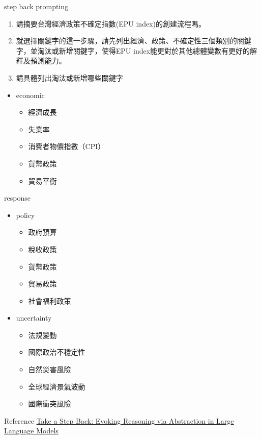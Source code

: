 \documentclass[12pt]{beamer}
\begin{document}
\begin{frame}{step back prompting}
    \begin{enumerate}
        \item 請摘要台灣經濟政策不確定指數(EPU index)的創建流程嗎。
        \item 就選擇關鍵字的這一步驟，請先列出經濟、政策、不確定性三個類別的關鍵字，並淘汰或新增關鍵字，使得EPU index能更對於其他總體變數有更好的解釋及預測能力。
        \item 請具體列出淘汰或新增哪些關鍵字
    \end{enumerate}

    \begin{itemize}
        \item economic
        \begin{itemize}
            \item 經濟成長
            \item 失業率
            \item 消費者物價指數（CPI）
            \item 貨幣政策
            \item 貿易平衡
        \end{itemize}
    \end{itemize}
\end{frame}

\begin{frame}{response}
    \begin{itemize}
        \item policy
        \begin{itemize}
            \item 政府預算
            \item 稅收政策
            \item 貨幣政策
            \item 貿易政策
            \item 社會福利政策
        \end{itemize}
        \item uncertainty
        \begin{itemize}
            \item 法規變動
            \item 國際政治不穩定性
            \item 自然災害風險
            \item 全球經濟景氣波動
            \item 國際衝突風險
        \end{itemize}
    \end{itemize}

\end{frame}

\begin{frame}{Reference}
    \href{https://arxiv.org/abs/2310.06117}{Take a Step Back: Evoking Reasoning via Abstraction in Large Language Models}
\end{frame}
\end{document}
